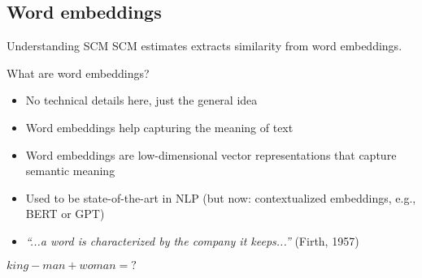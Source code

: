 \subsection{Word embeddings}

\begin{frame}{Understanding SCM}
SCM estimates extracts similarity from \alert{word embeddings}. 
	\begin{block}{What are word embeddings?}
		\begin{itemize}[<+>]
			\item No technical details here, just the general idea
			\item Word embeddings help capturing the meaning of text
			\item Word embeddings are low-dimensional vector representations that capture semantic meaning
			\item Used to be state-of-the-art in NLP (but now: contextualized embeddings, e.g., BERT or GPT)
			\item \emph{``...a word is characterized by the company it keeps...''} (Firth, 1957)
		\end{itemize}
	\end{block}
\end{frame}

\iffalse
\begin{frame}{}
\end{frame}

\begin{frame}{}
\end{frame}


\begin{frame}{}
	
	$king-man+woman = ?$ 
\end{frame}


\begin{frame}{}
\end{frame}


\begin{frame}{}
\end{frame}

